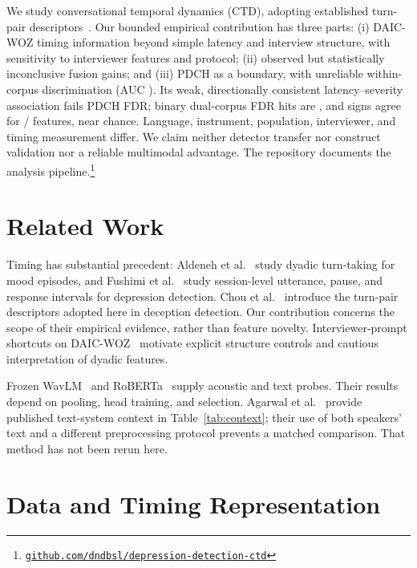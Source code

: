 \documentclass{article}
\begin{document}
We study conversational temporal dynamics (CTD), adopting  established turn-pair descriptors~\cite{chou2019joint,chou2021automatic}. Our bounded empirical contribution has three parts: (i) DAIC-WOZ timing information beyond simple latency and interview structure, with sensitivity to interviewer features and protocol; (ii) observed but statistically inconclusive fusion gains; and (iii) PDCH as a boundary, with unreliable within-corpus discrimination (AUC ). Its weak, directionally consistent latency--severity association fails PDCH FDR; binary dual-corpus FDR hits are , and signs agree for / features, near chance. Language, instrument, population, interviewer, and timing measurement differ. We claim neither detector transfer nor construct validation nor a reliable multimodal advantage. The repository documents the analysis pipeline.\footnote{\small\href{https://github.com/dndbsl/depression-detection-ctd}{\nolinkurl{github.com/dndbsl/depression-detection-ctd}}}

\section{Related Work}
Timing has substantial precedent: Aldeneh et al.~\cite{aldeneh2019mood} study dyadic turn-taking for mood episodes, and Fushimi et al.~\cite{fushimi2026beyond} study session-level utterance, pause, and response intervals for depression detection. Chou et al.~\cite{chou2019joint,chou2021automatic} introduce the turn-pair descriptors adopted here in deception detection. Our contribution concerns the scope of their empirical evidence, rather than feature novelty. Interviewer-prompt shortcuts on DAIC-WOZ~\cite{burdisso2024prompts} motivate explicit structure controls and cautious interpretation of dyadic features.

Frozen WavLM~\cite{chen2022wavlm} and RoBERTa~\cite{liu2019roberta} supply acoustic and text probes. Their results depend on pooling, head training, and selection. Agarwal et al.~\cite{agarwal2024discourse} provide published text-system context in Table~\ref{tab:context}; their use of both speakers' text and a different preprocessing protocol prevents a matched comparison. That method has not been rerun here.

\section{Data and Timing Representation}
\end{document}
